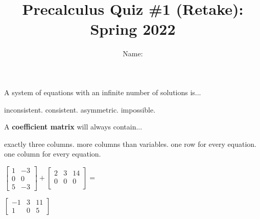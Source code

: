 \documentclass{exam}
\title{Precalculus Quiz \#1 (Retake): Spring 2022  }
\author{  Name:   }
\begin{document}
\maketitle
\thispagestyle{empty}

\begin{questions}
\question 

\begin{multicols}{2}
A system of equations with an infinite number of solutions is... 

\columnbreak
\begin{choices}
\choice inconsistent.
\choice consistent.
\choice asymmetric.
\choice impossible.
\end{choices}

\end{multicols}



\question
\begin{multicols}{2}
A \textbf{coefficient matrix} will always contain...

\columnbreak

\begin{choices}
\choice exactly three columns.
\choice  more columns than variables.
\choice one row for every equation.
\choice  one column for every equation.
\end{choices}
\end{multicols}

\vspace{0.5cm}
\question 
\label{two}

\begin{multicols}{2}
\hspace{1cm}$

\begin{bmatrix}
1 & -3 \\
0 & 0 \\
5 & -3
\end{bmatrix}
+
\begin{bmatrix}
2 & 3 &  14\\
0 & 0  & 0 \\

\end{bmatrix}
=
$

\vspace{1cm}
\begin{choices}
\choice 
$
\begin{bmatrix}
-1 & 3 & 11\\
1 & 0 & 5
\end{bmatrix}
$


\end{choices}
\end{multicols}
\end{questions}
\end{document}
